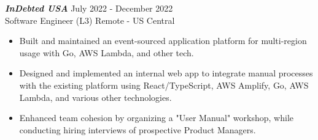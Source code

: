 {\sl \textbf{InDebted USA}} \hfill July 2022 - December 2022 \\ Software Engineer (L3) \hfill Remote - US Central
\begin{itemize}
    \item Built and maintained an event-sourced application platform for multi-region usage with Go, AWS Lambda, and other tech.
    \item Designed and implemented an internal web app to integrate manual processes with the existing platform using React/TypeScript, AWS Amplify, Go, AWS Lambda, and various other technologies.
    \item Enhanced team cohesion by organizing a "User Manual" workshop, while conducting hiring interviews of prospective Product Managers.
\end{itemize}
